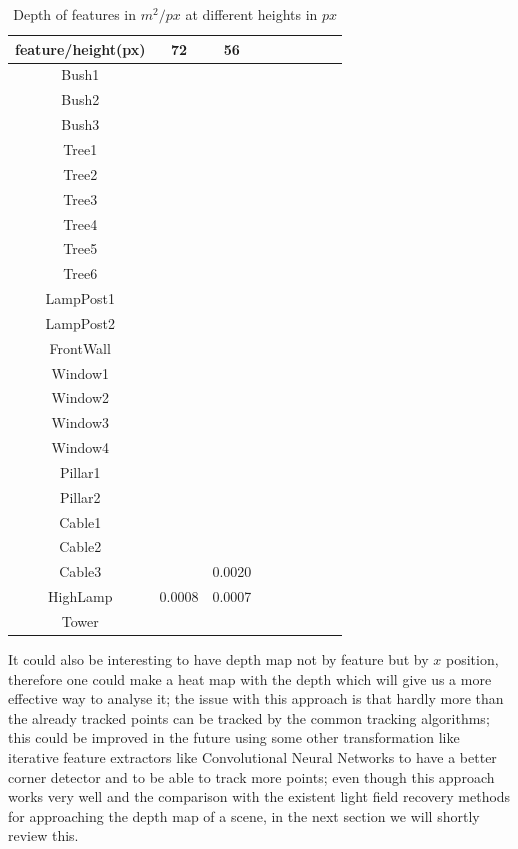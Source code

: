 \begin{table}[!htb]
\centering
    \begin{tabular}{| c | c | c | c | c | c | c | c | c |}
    \hline
    feature/height(px) & 72 & 56\\ \hline
		 Bush1 &  &  \\ \hline
		 Bush2 &  &  \\ \hline	
		 Bush3 &  &  \\ \hline	
		 Tree1 &  &  \\ \hline	
		 Tree2 &  &   \\ \hline	
		 Tree3 &  &   \\ \hline	
		 Tree4 &  &   \\ \hline	
		 Tree5 &  &   \\ \hline	
		 Tree6 &  &    \\ \hline	
     LampPost1 &  &  \\ \hline
		 LampPost2 &  &  \\ \hline
		 FrontWall &  &  \\ \hline
		 Window1 &  &  \\ \hline
		 Window2 &  &  \\ \hline
		 Window3 &  &  \\ \hline
		 Window4 &  &  \\ \hline
		 Pillar1 &  &   \\ \hline
		 Pillar2 &  &  \\ \hline
		 Cable1 &  &  \\ \hline
	   Cable2 &  &  \\ \hline
	   Cable3 &  & 0.0020\\ \hline
		 HighLamp & 0.0008 & 0.0007  \\ \hline
	   Tower &  & \\ \hline
    \end{tabular}
		\caption{Depth of features in $m^2/px$ at different heights in $px$}\label{table6}
\end{table}

It could also be interesting to have depth map not by feature but by $x$ position, therefore one could make a heat map with the depth which will give us a more effective way to analyse it; the issue with this approach is that hardly more than the already tracked points can be tracked by the common tracking algorithms; this could be improved in the future using some other transformation like iterative feature extractors like Convolutional Neural Networks\cite{DCNN} to have a better corner detector and to be able to track more points; even though this approach works very well and the comparison with the existent light field recovery methods for approaching the depth map of a scene, in the next section we will shortly review this. 


